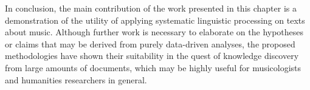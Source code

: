 In conclusion, the main contribution of the work presented in this chapter is a demonstration of the utility of applying systematic linguistic processing on texts about music. Although further work is necessary to elaborate on the hypotheses or claims that may be derived from purely data-driven analyses, the proposed methodologies have shown their suitability in the quest of knowledge discovery from large amounts of documents, which may be highly useful for musicologists and humanities researchers in general.
